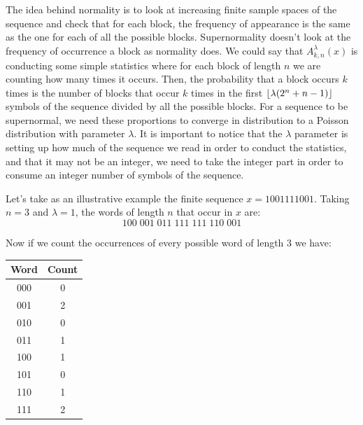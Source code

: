 \documentclass[11pt,a4paper]{tesis}
\theoremstyle{definition}
\DeclarePairedDelimiter{\floor}{\lfloor}{\rfloor}
\begin{document}

The idea behind normality is to look at increasing finite sample spaces of the sequence and check that for each block, the frequency of appearance is the same as the one for each of all the possible blocks.
Supernormality doesn't look at the frequency of occurrence a block as normality does. We could say that $A^\lambda_{k,n}(x)$ is conducting some simple statistics where for each block of length $n$ we are counting how many times it occurs. 
 Then, the probability that a block occurs $k$ times is the number of blocks that occur $k$ times in the first $\floor{\lambda(2^n + n - 1)}$ symbols of the sequence divided by all the possible blocks.
For a sequence to be supernormal, we need these proportions to converge in distribution to a Poisson distribution with parameter $\lambda$.
It is important to notice that the $\lambda$ parameter is setting up how much of the sequence we read in order to conduct the statistics, and that it may not be an integer, we need to take the integer part in order to consume an integer number of symbols of the sequence.


Let's take as an illustrative example the finite sequence $x = 1001111001$. Taking $n=3$ and $\lambda = 1$, the words of length $n$ that occur in $x$ are:
$$100 \; 001 \; 011\; 111\; 111\; 110\; 001$$

Now if we count the occurrences of every possible word of length $3$ we have:

\begin{center}
    \begin{tabular}{|c | c|} 
    \hline
    Word & Count \\ [0.5ex] 
    \hline
    000 & 0 \\ 
    \hline
    001 & 2 \\ 
    \hline
    010 & 0 \\ 
    \hline
    011 & 1 \\ 
    \hline
    100 & 1 \\ 
    \hline
    101 & 0 \\ 
    \hline
    110 & 1 \\ 
    \hline
    111 & 2 \\ 
    \hline
   \end{tabular}
\end{center}
\end{document}
